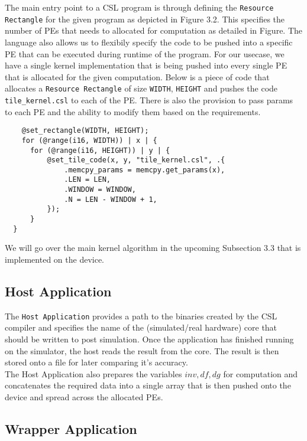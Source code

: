 The main entry point to a CSL program is through defining the \texttt{Resource Rectangle} for the given program as depicted in Figure 3.2.
This specifies the number of PEs that needs to allocated for computation as detailed in Figure.
The language also allows us to flexibily specify the code to be pushed into a specific PE that can be executed during runtime of the program.
For our usecase, we have a single kernel implementation that is being pushed into every single PE that is allocated for the given computation.
Below is a piece of code that allocates a \texttt{Resource Rectangle} of size \texttt{WIDTH}, \texttt{HEIGHT} and pushes the code \texttt{tile\_kernel.csl} to each of the PE.
There is also the provision to pass params to each PE and the ability to modify them based on the requirements.\\

\clearpage
\begin{lstlisting}
    @set_rectangle(WIDTH, HEIGHT);
    for (@range(i16, WIDTH)) | x | {
      for (@range(i16, HEIGHT)) | y | {
          @set_tile_code(x, y, "tile_kernel.csl", .{ 
              .memcpy_params = memcpy.get_params(x),
              .LEN = LEN,
              .WINDOW = WINDOW,
              .N = LEN - WINDOW + 1,
          });
      }
  }
\end{lstlisting}

We will go over the main kernel algorithm in the upcoming Subsection 3.3 that is implemented on the device.

\subsection{Host Application}

The \texttt{Host Application} provides a path to the binaries created by the CSL compiler and specifies the name of the (simulated/real hardware)
core that should be written to post simulation. Once the application has finished running
on the simulator, the host reads the result from the core. The result is then stored onto a file for later comparing it's accuracy.\\

The Host Application also prepares the variables \(inv, df, dg\) for computation and concatenates the required data into a single array that is then pushed onto the device and spread across the allocated PEs.

\subsection{Wrapper Application}

